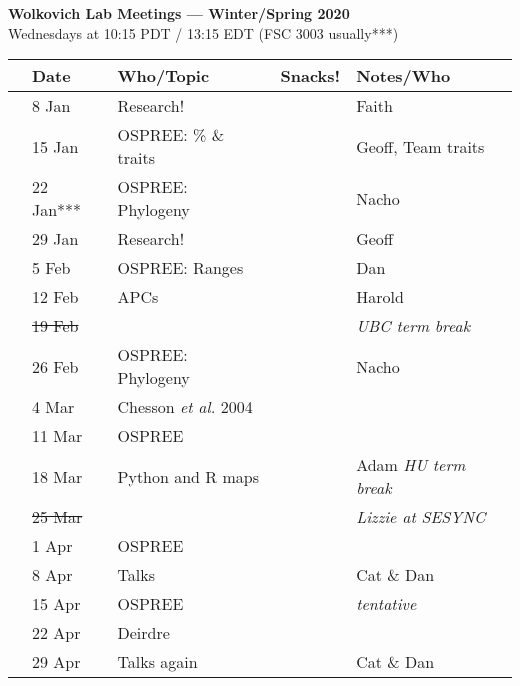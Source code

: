 \documentclass[11pt]{article}
\begin{document}
 
\raggedright
{}

\begin{center} 
{\large \textbf{Wolkovich Lab Meetings --- Winter/Spring 2020}} \\ [2pt]
Wednesdays at 10:15 PDT / 13:15 EDT (FSC 3003 usually***)\\
\end{center} 

\begin{center}
\begin{tabular}{ p{0.2 cm}  p{2 cm}  p{5 cm}  p{2 cm}  p{4 cm} }  \hline \hline
 & \textbf{Date}
   & \textbf{Who/Topic}
      & \textbf{Snacks!} 
         & \textbf{Notes/Who} \\ 
\hline \hline
 & 8 Jan & Research! &       & Faith  \\\hline
 & 15 Jan & OSPREE: \% \& traits   &  & Geoff, Team traits \\\hline
 & 22 Jan*** & OSPREE: Phylogeny &      & Nacho \\\hline  
 & 29 Jan & Research! &       &  Geoff\\\hline
 & 5 Feb & OSPREE: Ranges &  & Dan \\\hline
 & 12 Feb & APCs &    & Harold\\\hline
 & \sout{19 Feb} & &       & \emph{UBC term break}   \\\hline 
 & 26 Feb  & OSPREE: Phylogeny  &       & Nacho \\\hline
 & 4 Mar & Chesson \emph{et al.} 2004 &   &     \\\hline
 & 11 Mar & OSPREE &       & \\\hline
 & 18 Mar & Python and R maps &       & Adam  \emph{HU term break} \\\hline
 & \sout{25 Mar} & &       &\emph{Lizzie at SESYNC}   \\\hline
 & 1 Apr & OSPREE&   & \\\hline
 & 8 Apr & Talks &    &Cat \& Dan \\\hline
 & 15 Apr & OSPREE &    & \emph{tentative} \\\hline
 & 22 Apr & Deirdre &    & \\\hline
 & 29 Apr & Talks again &    & Cat \& Dan \\\hline

\hline
\end{tabular}
\end{center}
\end{document}
